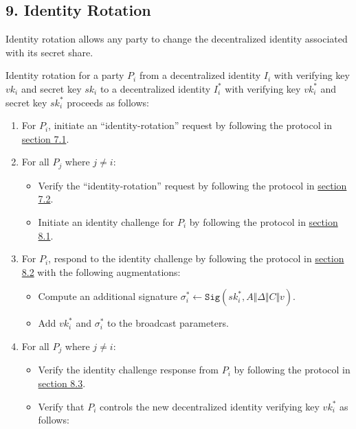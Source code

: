 \documentclass[
]{article}
\providecommand{\tightlist}{%
  \setlength{\itemsep}{0pt}\setlength{\parskip}{0pt}}
\begin{document}
\hypertarget{identity-rotation}{%
\subsection{9. Identity Rotation}\label{identity-rotation}}

Identity rotation allows any party to change the decentralized identity
associated with its secret share.

Identity rotation for a party \(P_i\) from a decentralized identity
\(I_i\) with verifying key \(vk_i\) and secret key \(sk_i\) to a
decentralized identity \(I_i^ \ast\) with verifying key \(vk_i^ \ast\)
and secret key \(sk_i^ \ast\) proceeds as follows:

\begin{enumerate}
\def\labelenumi{\arabic{enumi}.}
\tightlist
\item
  For \(P_i\), initiate an ``identity-rotation'' request by following
  the protocol in
  \protect\hyperlink{identity-authed-request-initiation}{section 7.1}.
\item
  For all \(P_j\) where \(j \neq i\):

  \begin{itemize}
  \tightlist
  \item
    Verify the ``identity-rotation'' request by following the protocol
    in \protect\hyperlink{identity-authed-request-verification}{section
    7.2}.
  \item
    Initiate an identity challenge for \(P_i\) by following the protocol
    in \protect\hyperlink{identity-challenge-initiation}{section 8.1}.
  \end{itemize}
\item
  For \(P_i\), respond to the identity challenge by following the
  protocol in \protect\hyperlink{identity-challenge-response}{section
  8.2} with the following augmentations:

  \begin{itemize}
  \tightlist
  \item
    Compute an additional signature
    \(\sigma _i^ \ast \leftarrow \mathtt{Sig}(sk_i^ \ast, A \Vert \Delta \Vert C \Vert v)\).
  \item
    Add \(vk_i^ \ast\) and \(\sigma _i^ \ast\) to the broadcast
    parameters.
  \end{itemize}
\item
  For all \(P_j\) where \(j \neq i\):

  \begin{itemize}
  \tightlist
  \item
    Verify the identity challenge response from \(P_i\) by following the
    protocol in
    \protect\hyperlink{identity-challenge-verification}{section 8.3}.
  \item
    Verify that \(P_i\) controls the new decentralized identity
    verifying key \(vk_i^ \ast\) as follows:


\end{itemize}
\end{enumerate}
\end{document}
